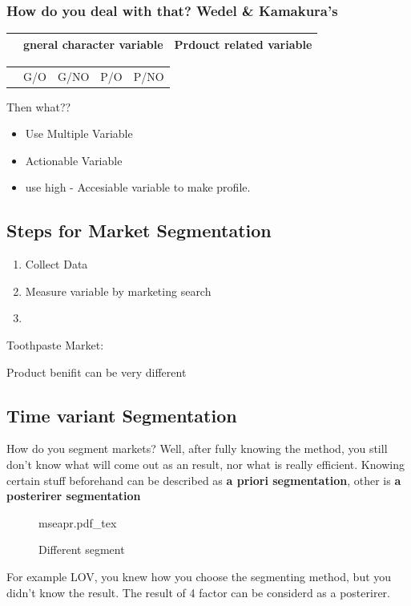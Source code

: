 \documentclass[12pt]{article}
\begin{document}
\subsubsection{How do you deal with that? Wedel & Kamakura's}

\begin{tabular}{c|cc}
	\hline
	& gneral character variable & Prdouct related variable \\
	\hline


\end{tabular}

\begin{tabular}{|c|c|c|c|c|}
	\hline
	 & G/O & G/NO & P/O & P/NO \\

\end{tabular}

{\large Then what??}

\begin{itemize}
	\item Use Multiple Variable
	\item Actionable Variable
	\item use high - Accesiable variable to make profile.
\end{itemize}

\subsection{Steps for Market Segmentation}

\begin{enumerate}
	\item Collect Data
	\item Measure variable by marketing search
	\item %
\end{enumerate}


	Toothpaste Market:

\begin{tcolorbox}
	Product benifit can be very different


\end{tcolorbox}

\subsection{Time variant Segmentation}

How do you segment markets? Well, after fully knowing the method, you still don't know what will come out as an result, nor what is really efficient.
Knowing certain stuff beforehand can be described as \textbf{a priori segmentation}, other is \textbf{a posterirer segmentation}
\begin{figure}[H]
	\centering
	\def\svgwidth{\columnwidth}
	{mseapr.pdf_tex}
	\caption{Different segment}
	\label{fig:mseapr}
\end{figure}
For example LOV, you knew how you choose the segmenting method, but you didn't know the result. The result of 4 factor can be considerd as a posterirer.
\end{document}
